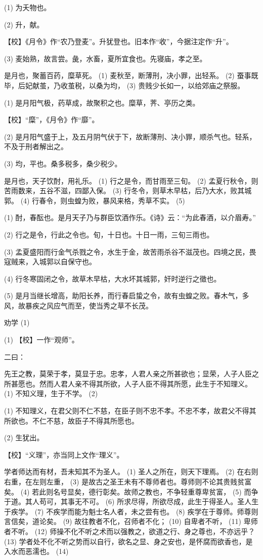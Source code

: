 \documentclass[12pt,UTF8]{ctexbook}
\begin{document}
(1) 为夭物也。

(2) 升，献。

【校】《月令》作“农乃登麦”。升犹登也。旧本作“收”，今据注定作“升”。

(3) 麦始熟，故言尝。彘，水畜，夏所宜食也。先寝庙，孝之至。

是月也，聚蓄百药，糜草死。 (1) 麦秋至，断薄刑，决小罪，出轻系。 (2) 蚕事既毕，后妃献茧，乃收茧税，以桑为均， (3) 贵贱少长如一，以给郊庙之祭服。

(1) 是月阳气极，药草成，故聚积之也。糜草，荠、亭历之类。

【校】“糜”，《月令》作“靡”。

(2) 是月阳气盛于上，及五月阴气伏于下，故断薄刑、决小罪，顺杀气也。轻系，不及于刑者解出之。

(3) 均，平也。桑多税多，桑少税少。

是月也，天子饮酎，用礼乐。 (1) 行之是令，而甘雨至三旬。 (2) 孟夏行秋令，则苦雨数来，五谷不滋，四鄙入保。 (3) 行冬令，则草木早枯，后乃大水，败其城郭。 (4) 行春令，则虫蝗为败，暴风来格，秀草不实。 (5)

(1) 酎，春酝也。是月天子乃与群臣饮酒作乐。《诗》云：“为此春酒，以介眉寿。”

(2) 行之是令，行此之令也。旬，十日也。十日一雨，三旬三雨也。

(3) 孟夏盛阳而行金气杀戮之令，水生于金，故苦雨杀谷不滋茂也。四境之民，畏寇贼来，入城郭以自保守也。

(4) 行冬寒固闭之令，故草木早枯，大水坏其城郭，奸时逆行之徵也。

(5) 是月当继长增高，助阳长养，而行春启蛰之令，故有虫蝗之败。春木气，多风，故暴疾之风应气而至，使当秀之草不长茂。





劝学 (1)


(1) 【校】一作“观师”。

二曰：

先王之教，莫荣于孝，莫显于忠。忠孝，人君人亲之所甚欲也；显荣，人子人臣之所甚愿也。然而人君人亲不得其所欲，人子人臣不得其所愿，此生于不知理义。 (1) 不知义理，生于不学。 (2)

(1) 不知理义，在君父则不仁不慈，在臣子则不忠不孝。不忠不孝，故君父不得其所欲也。不仁不慈，故臣子不得其所愿也。

(2) 生犹出。

【校】“义理”，亦当同上文作“理义”。

学者师达而有材，吾未知其不为圣人。 (1) 圣人之所在，则天下理焉。 (2) 在右则右重，在左则左重， (3) 是故古之圣王未有不尊师者也。尊师则不论其贵贱贫富矣。 (4) 若此则名号显矣，德行彰矣。故师之教也，不争轻重尊卑贫富， (5) 而争于道。其人苟可，其事无不可。 (6) 所求尽得，所欲尽成，此生于得圣人。圣人生于疾学。 (7) 不疾学而能为魁士名人者，未之尝有也。 (8) 疾学在于尊师。师尊则言信矣，道论矣。 (9) 故往教者不化，召师者不化； (10) 自卑者不听， (11) 卑师者不听。 (12) 师操不化不听之术而以强教之，欲道之行、身之尊也，不亦远乎？ (13) 学者处不化不听之势而以自行，欲名之显、身之安也，是怀腐而欲香也，是入水而恶濡也。 (14)
\end{document}
